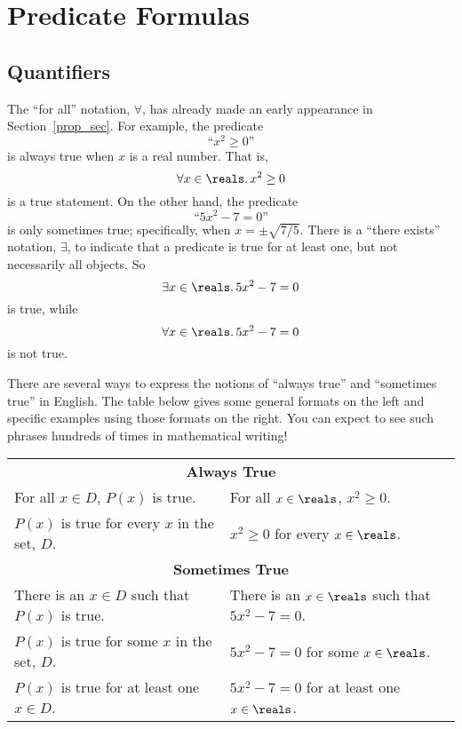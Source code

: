 \begin{problems}

\homeworkproblems
{}

\end{problems}

\section{Predicate Formulas}\label{predicate_sec}

\subsection{Quantifiers}\label{quantifier_sec}
The ``for all'' notation, $\forall$, has already made an early
appearance in Section~\ref{prop_sec}.  For example, the predicate
\[
\text{``$x^2 \geq 0$''}
\]
is always true when $x$ is a real number.  That is,
\[
\forall x \in \reals.\, x^2 \geq 0
\]
is a true statement.  On the other hand, the predicate
\[
\text{``$5x^2 - 7 = 0$''}
\]
is only sometimes true; specifically, when $x = \pm \sqrt{7/5}$.
There is a ``there exists'' notation, $\exists$, to indicate that a
predicate is true for at least one, but not necessarily all objects.
So 
\[
\exists x \in \reals.\, 5x^2 - 7 = 0
\]
is true, while
\[
\forall x \in \reals.\, 5x^2 - 7 = 0
\]
is not true.

There are several ways to express the notions of ``always true'' and
``sometimes true'' in English.  The table below gives some general
formats on the left and specific examples using those formats on the
right.  You can expect to see such phrases hundreds of times in
mathematical writing!
\begin{center}
\begin{tabular}{ll}
\multicolumn{2}{c}{\textbf{Always True}} \\[1ex]
For all $x \in D$, $P(x)$ is true. & For all $x \in \reals$, $x^2 \geq 0$. \\
$P(x)$ is true for every $x$ in the set, $D$. & $x^2 \geq 0$ for every $x \in \reals$. \\[2ex]
\multicolumn{2}{c}{\textbf{Sometimes True}} \\[1ex]
There is an $x \in D$ such that $P(x)$ is true. & There is an $x \in \reals$ such that $5x^2 - 7 = 0$.\\
$P(x)$ is true for some $x$ in the set, $D$. & $5x^2 - 7 = 0$ for some $x \in \reals$.\\
$P(x)$ is true for at least one $x \in D$. & $5x^2-7=0$ for at least one $x \in \reals$.
\end{tabular}
\end{center}

